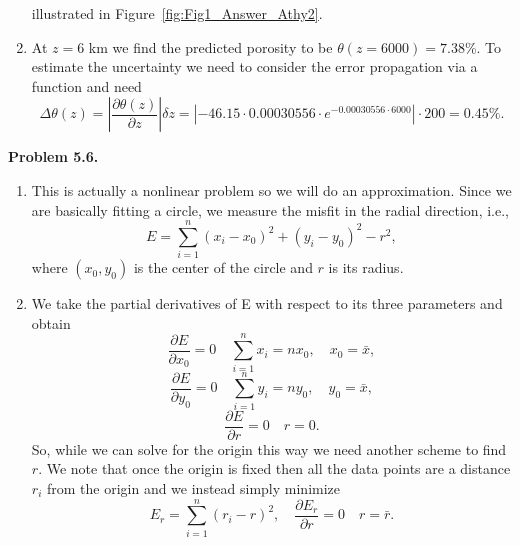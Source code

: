\begin{enumerate}[label=\alph*)]
$$$$
illustrated in Figure~\ref{fig:Fig1_Answer_Athy2}.
\item At $z = 6$ km we find the predicted porosity to be $\theta(z=6000) = 7.38$\%.
To estimate the uncertainty we need to consider the error propagation via a function
and need
\[\Delta \theta (z) = \left| {\frac{{\partial \theta (z)}}{{\partial z}}} \right|\delta z = \left| -46.15 \cdot 0.00030556 \cdot{e^{ - 0.00030556 \cdot 6000}}\right| \cdot 200 = 0.45\%. \]\end{enumerate}
\noindent
\bf{Problem 5.6.} \\

\begin{enumerate}[label=\alph*)]
\item This is actually a nonlinear problem so we will do an approximation.
Since we are basically fitting a circle, we measure the misfit in the radial direction, i.e.,
$$
E = \sum_{i=1}^n \left (x_i - x_0\right)^2 +  \left (y_i - y_0\right)^2 - r^2,
$$
where $(x_0, y_0)$ is the center of the circle and $r$ is its radius.
\item  We take the partial derivatives of E with respect to its three parameters and obtain
$$
\frac{\partial E}{\partial x_0} = 0 \quad \sum_{i=1}^n x_i = n x_0, \quad x_0 = \bar{x},
$$
$$
\frac{\partial E}{\partial y_0} = 0 \quad \sum_{i=1}^n y_i = n y_0, \quad y_0 = \bar{x},
$$
$$
\frac{\partial E}{\partial r} = 0 \quad r = 0.
$$
So, while we can solve for the origin this way we need another scheme to find $r$.  
We note that once the origin is fixed then all the data points are a distance $r_i$ from the
origin and we instead simply minimize
$$
E_r = \sum_{i=1}^n \left (r_i - r\right )^2, \quad \frac{\partial E_r}{\partial r} = 0 \quad r = \bar{r}.
$$
\end{enumerate}


